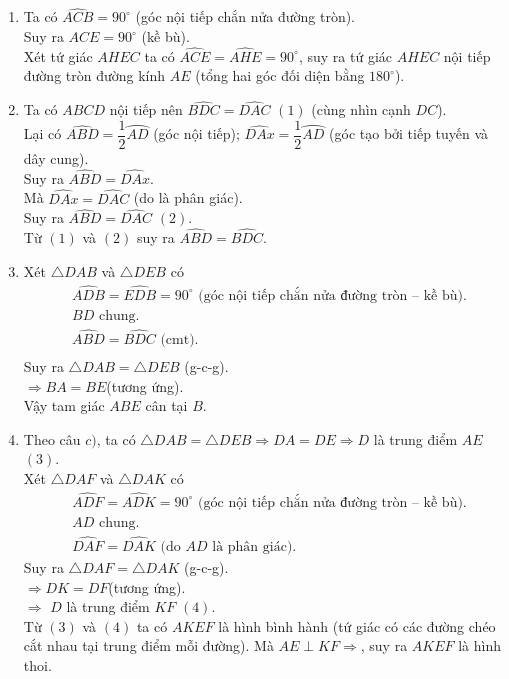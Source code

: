 \begin{bt}
{\begin{enumerate}
\item 	Ta có $\widehat{ACB}= 90^\circ$ (góc nội tiếp chắn nửa đường tròn).\\
	Suy ra $\widehat{ACE}= 90^\circ $ (kề bù).\\
	Xét tứ giác $AHEC$ ta có $\widehat{ACE}=\widehat{AHE}= 90^\circ $,
	suy ra tứ giác $AHEC$ nội tiếp đường tròn đường kính $AE$ (tổng hai góc đối diện bằng $180^\circ $).
	\item  Ta có $ABCD$ nội tiếp nên $\widehat{BDC}=\widehat{DAC}$  $(1)$ (cùng nhìn cạnh $DC$).\\
	Lại có $\widehat{ABD}=\dfrac{1}{2}\wideparen{AD}$ (góc nội tiếp); 
	$\widehat{DAx}=\dfrac{1}{2}\wideparen{AD}$ (góc tạo bởi tiếp tuyến và dây cung).\\
	Suy ra	$\widehat{ABD}=\widehat{DAx}$.\\
	Mà		$\widehat{DAx}=\widehat{DAC}$ (do  là phân giác).\\
	Suy ra	$\widehat{ABD}=\widehat{DAC}$  $(2)$.\\
	Từ $(1)$ và $(2)$ suy ra $\widehat{ABD}=\widehat{BDC}$. 
	\item Xét $\triangle DAB$ và $ \triangle DEB$ có 
	\begin{align*}
		&\widehat{ADB}=\widehat{EDB}=  90^\circ \text{ (góc nội tiếp chắn nửa đường tròn – kề bù).}\\
		&BD \text{ chung.}\\
		&\widehat{ABD}=\widehat{BDC} \text{ (cmt)}.\\
	\end{align*}
	Suy ra $\triangle DAB=\triangle DEB$ (g-c-g).\\
	$\Rightarrow BA=BE$(tương ứng).\\
	Vậy tam giác $ABE$ cân tại $B$.
	\item  Theo câu $c)$, ta có $ \triangle DAB=\triangle DEB\Rightarrow DA=DE\Rightarrow D$ là trung điểm $AE$	$(3)$.\\
	Xét $ \triangle DAF$ và $ \triangle DAK$ có
	\begin{align*}
		&\widehat{ADF}=\widehat{ADK}= 90^\circ  \text{ (góc nội tiếp chắn nửa đường tròn – kề bù).}\\
		&AD \text{ chung.}\\
		&\widehat{DAF}=\widehat{DAK} \text{ (do $AD$ là phân giác).}
	\end{align*}
	Suy ra $\triangle DAF=\triangle DAK$ (g-c-g).\\
	$\Rightarrow DK=DF$(tương ứng).\\
	$\Rightarrow$ $D$ là trung điểm $KF$ \quad	$(4)$.\\
	Từ $(3)$ và $(4)$ ta có $AKEF$ là hình bình hành (tứ giác có các đường chéo cắt nhau tại trung điểm mỗi đường).
	Mà $AE\perp KF\Rightarrow $, suy ra   $AKEF$ là hình thoi.
\end{enumerate}





}
\end{bt}

